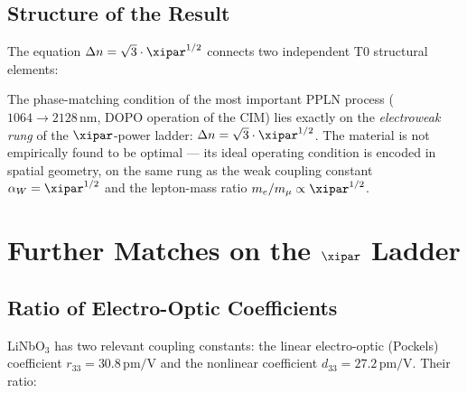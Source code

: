 \subsection{Structure of the Result}

The equation $\Delta n = \sqrt{3}\cdot\xipar^{1/2}$ connects two independent
T0 structural elements:

\begin{center}
\renewcommand{\arraystretch}{1.5}
\end{center}

\begin{important}
The phase-matching condition of the most important PPLN process
($1064 \to 2128\,\text{nm}$, DOPO operation of the CIM) lies exactly on
the \emph{electroweak rung} of the $\xipar$-power ladder:
$\Delta n = \sqrt{3}\cdot\xipar^{1/2}$. The material is not empirically
found to be optimal — its ideal operating condition is encoded in spatial
geometry, on the same rung as the weak coupling constant
$\alpha_W = \xipar^{1/2}$ and the lepton-mass ratio $m_e/m_\mu \propto
\xipar^{1/2}$.
\end{important}

\clearpage

\section{Further Matches on the \texorpdfstring{$\xipar$}{xi} Ladder}
\label{sec:further}

\subsection{Ratio of Electro-Optic Coefficients}

LiNbO$_3$ has two relevant coupling constants: the linear electro-optic
(Pockels) coefficient $r_{33} = 30.8\,\text{pm/V}$ and the nonlinear
coefficient $d_{33} = 27.2\,\text{pm/V}$.  Their ratio:

